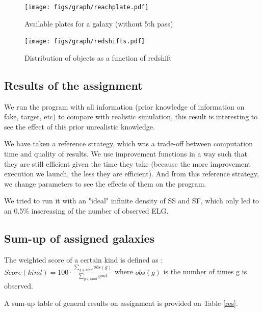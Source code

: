 \documentclass{article}
\begin{document}
\begin{figure}[H]\begin{center}
	\texttt{[image: figs/graph/reachplate.pdf]}
	\caption{Available plates for a galaxy (without 5th pass)}\label{reachplate}
\end{center}\end{figure}

\begin{figure}[H]\begin{center}
	\texttt{[image: figs/graph/redshifts.pdf]}
	\caption{Distribution of objects as a function of redshift}\label{redshifts}
\end{center}\end{figure}

\subsection{Results of the assignment}
We run the program with all information (prior knowledge of information on fake, target, etc) to compare with realistic simulation, this result is interesting to see the effect of this prior unrealistic knowledge.

We have taken a reference strategy, which was a trade-off between computation time and quality of results. We use improvement functions in a way such that they are still efficient given the time they take (because the more improvement execution we launch, the less they are efficient). And from this reference strategy, we change parameters to see the effects of them on the program.

We tried to run it with an "ideal" infinite density of SS and SF, which only led to an 0.5\% inscreasing of the number of observed ELG.

\subsection{Sum-up of assigned galaxies}
The weighted score of a certain kind is defined as : 
\vspace{1\baselineskip}
$Score(kind) = 100\cdot \frac{\sum\nolimits_{g \in kind} obs(g)}{\sum\nolimits_{g \in kind} goal}$ where $obs(g)$ is the number of times g is observed.

A sum-up table of general results on assignment is provided on Table \ref{res}.
\end{document}
